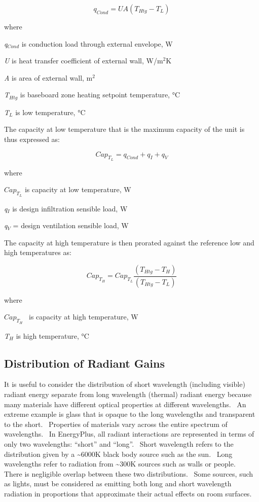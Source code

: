 \begin{equation}
{q_{Cond}} = UA\left( {{T_{Htg}} - {T_L}} \right)
\end{equation}

where

\emph{q\(_{Cond}\)} is conduction load through external envelope, W

\emph{U} is heat transfer coefficient of external wall, W/m\(^{2}\)K

\emph{A} is area of external wall, m\(^{2}\)

\emph{T\(_{Htg}\)} is baseboard zone heating setpoint temperature, °C

\emph{T\(_{L}\)} is low temperature, °C

The capacity at low temperature that is the maximum capacity of the unit is thus expressed as:

\begin{equation}
Ca{p_{{T_L}}} = {q_{Cond}} + {q_I} + {q_V}
\end{equation}

where

\(Ca{p_{{T_L}}}\) is capacity at low temperature, W

\emph{q\(_{I}\)} is design infiltration sensible load, W

\emph{q\(_{V}\)} = design ventilation sensible load, W

The capacity at high temperature is then prorated against the reference low and high temperatures as:

\begin{equation}
Ca{p_{{T_H}}} = Ca{p_{{T_L}}}\frac{{\left( {{T_{Htg}} - {T_H}} \right)}}{{\left( {{T_{Htg}} - {T_L}} \right)}}
\end{equation}

where

\(Ca{p_{{T_H}}}\) ~is capacity at high temperature, W

\emph{T\(_{H}\)} is high temperature, °C

\subsection{Distribution of Radiant Gains}\label{distribution-of-radiant-gains}

It is useful to consider the distribution of short wavelength (including visible) radiant energy separate from long wavelength (thermal) radiant energy because many materials have different optical properties at different wavelengths.~ An extreme example is glass that is opaque to the long wavelengths and transparent to the short.~ Properties of materials vary across the entire spectrum of wavelengths.~ In EnergyPlus, all radiant interactions are represented in terms of only two wavelengths: ``short'' and ``long''.~ Short wavelength refers to the distribution given by a \textasciitilde{}6000K black body source such as the sun.~ Long wavelengths refer to radiation from \textasciitilde{}300K sources such as walls or people.~ There is negligible overlap between these two distributions.~ Some sources, such as lights, must be considered as emitting both long and short wavelength radiation in proportions that approximate their actual effects on room surfaces.

